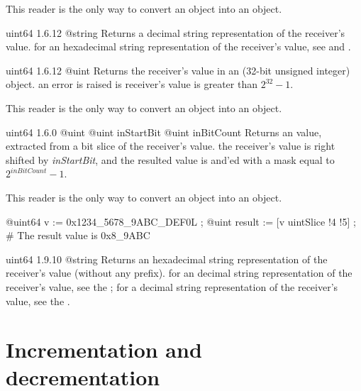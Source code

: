 This reader is the only way to convert an  object into an  object.


{uint64}
{1.6.12}
{@string}
{Returns a decimal string representation of the receiver's value.}
{for an hexadecimal string representation of the receiver's value, see  and .}



{uint64}
{1.6.12}
{@uint}
{Returns the receiver's value in an  (32-bit unsigned integer) object.}
{an error is raised is receiver's value is greater than $2^{32}-1$.}

This reader is the only way to convert an  object into an  object.


{uint64}
{1.6.0}
{@uint}
{@uint inStartBit}
{@uint inBitCount}
{Returns an  value, extracted from a bit slice of the receiver's value.}
{the receiver's value is right shifted by \emph{inStartBit}, and the resulted value is and'ed with a mask equal to $2^{inBitCount}-1$.}

This reader is the only way to convert an  object into an  object.


\exempleDeuxLignes
{}
{@uint64 v := 0x1234\_5678\_9ABC\_DEF0L ;}
{@uint result := [v uintSlice !4 !5] ; \# The result value is 0x8\_9ABC}





{uint64}
{1.9.10}
{@string}
{Returns an hexadecimal string representation of the receiver's value (without any prefix).}
{for an decimal string representation of the receiver's value, see the ; for a decimal string representation of the receiver's value, see the .}






\section{Incrementation and decrementation}

